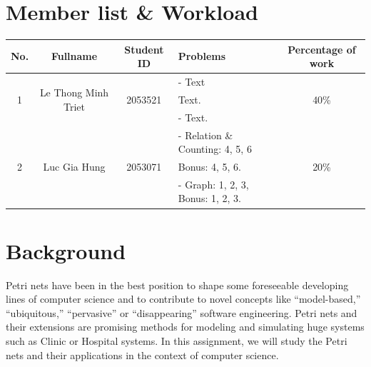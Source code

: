 \documentclass[a4paper]{article}
\begin{document}

\newpage
\tableofcontents
\newpage


\section{Member list \& Workload}

\begin{center}
	\begin{tabular}{|c|c|c|l|c|}
		\hline
		\textbf{No.}       & \textbf{Fullname}                    & \textbf{Student ID}      & \textbf{Problems}                 & \textbf{Percentage of work} \\
		\hline
		\multirow{3}{*}{1} & \multirow{3}{*}{Le Thong Minh Triet} & \multirow{3}{*}{2053521} & - Text                            & \multirow{3}{*}{40\%}       \\
		                   &                                      &                          & Text.                             &                             \\
		                   &                                      &                          & - Text.                           &                             \\
		\hline
		\multirow{3}{*}{2} & \multirow{3}{*}{Luc Gia Hung}        & \multirow{3}{*}{2053071} & - Relation \& Counting: 4, 5, 6   & \multirow{3}{*}{20\%}       \\
		                   &                                      &                          & Bonus: 4, 5, 6.                   &                             \\
		                   &                                      &                          & - Graph: 1, 2, 3, Bonus: 1, 2, 3. &                             \\
		\hline
	\end{tabular}
\end{center}
\newpage
\section{Background}
\indent Petri nets have been in the best position to shape some foreseeable developing lines of computer science and
to contribute to novel concepts like “model-based,” “ubiquitous,”
“pervasive” or “disappearing” software engineering. Petri nets and their extensions are promising methods for modeling and simulating
huge systems such as Clinic or Hospital systems. In this assignment, we will study the Petri nets and their applications in the context of computer science.
\end{document}
